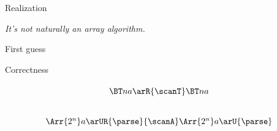 \documentclass[aspectratio=169]{beamer}
\begin{document}
\begin{frame}{Realization}
\begin{center}
\Large
\emph{It's not naturally an array algorithm.}
\end{center}
\end{frame}

\rnc{}

\begin{frame}{First guess}
\end{frame}

\nc{}
\nc{}
\nc{}
\nc{}
\nc{}
\nc{}

\begin{frame}{Correctness}

\[\begin{tikzcd}
  \BT n a \arR{\scanT} \BT n a \\
  \Arr{2^n}a \arUR{\parse}{\scanA} \Arr{2^n}a \arU{\parse}
\end{tikzcd}\]

\end{frame}
\end{document}
